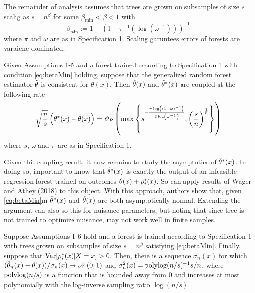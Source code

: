 The remainder of analysis assumes that trees are grown on subsamples of size $s$ scalig as $s = n^\beta$ for some $\beta_{\min} < \beta < 1$ with 
\begin{equation}
	\label{eq:betaMin}
	\beta_{\min} := 1 - \left(1 + \pi^{-1}\left(\log(\omega^{-1})\right)\right)^{-1}
\end{equation}
where $\pi$ and $\omega$ are as in Specification 1. Scaling garuntees errors of forests are varaicne-dominated. 

\begin{lemma}
\label{thm:main-result}
Given Assumptions 1-5 and a forest trained according to Specification 1 with condition \ref{eq:betaMin} holding, suppose that the generalized random forest estimator $\hat{\theta}$ is consistent for $\theta(x)$. Then $\hat{\theta}(x)$ and $\tilde{\theta}^*(x)$ are coupled at the following rate
\begin{equation}
	\sqrt{\frac{n}{s}}\left(\theta^*(x) - \hat{\theta}(x)\right) = \mathscr{O}_P \left( \max\left\{ 
	s^{-\frac{\pi \log \left( (1-\omega)^{-1}\right)}{2 \log \left( \omega^{-1}\right)}}, \left(\frac{s}{n}\right)^{\frac{1}{6}}\right\} \right)
\end{equation}
where $s$, $\omega$ and $\pi$ are as in Specification 1.
\end{lemma}
Given this coupling result, it now remains to study the asymptotics of $\tilde{\theta}^*(x)$. In doing so, important to know that $\tilde{\theta}^*(x)$ is exactly the output of an infeasible regression forest trained on outcomes $\theta(x) + \rho_{i}^*(x)$. So can apply results of Wager and Athey (2018) to this object. With this approach, authors show that, given \ref{eq:betaMin}m $\tilde{\theta}^*(x)$ and $\hat{\theta}(x)$ are both asymptotically normal. Extending the argument can also so this for nuisance parameters, but noting that since tree is not trained to optimize nuisance, may not work well in finite samples. 
\begin{theorem}
	\label{thm:clt}
	Suppose Assumptions 1-6 hold and a forest is trained according to Specification 1 with trees grown on subsamples of size $s = n^\beta$ satisfying \ref{eq:betaMin}. Finally, suppose that $\operatorname{Var}[\rho_{i}^*(x)|X=x] > 0.$ Then, there is a sequence $\sigma_n(x)$ for which $(\hat{\theta}_n(x) - \theta(x))/\sigma_n(x) \rightarrow \mathscr{N}(0,1)$ and $\sigma_n^2(x) = \operatorname{polylog}(n/s)^{-1}s/n$, where $\operatorname{polylog}(n/s)$ is a function that is bounded away from 0 and increases at most polynomially with the log-inverse sampling ratio $\log(n/s)$. 
\end{theorem}
